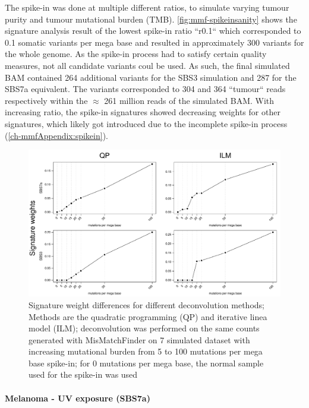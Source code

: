 The spike-in was done at multiple different ratios, to simulate varying tumour purity and tumour mutational burden (TMB). \autoref{fig:mmf-spikeinsanity} shows the signature analysis result of the lowest spike-in ratio ``r0.1`` which corresponded to 0.1 somatic variants per mega base and resulted in approximately 300 variants for the whole genome. As the spike-in process had to satisfy certain quality measures, not all candidate variants coul be used. As such, the final simulated BAM contained 264 additional variants for the SBS3 simulation and 287 for the SBS7a equivalent. The variants corresponded to 304 and 364 ``tumour`` reads respectively within the $\approx$ 261 million reads of the simulated BAM. With increasing ratio, the spike-in signatures showed decreasing weights for other signatures, which likely got introduced due to the incomplete spike-in process (\autoref{ch-mmfAppendix:spikein}).


\begin{figure}[ht]
\centering
\includegraphics[width=.99\linewidth]{Figures/MisMatchFinder/deconstructionMethodsDifferences.pdf}
\caption[Signature weight differences for different deconvolution methods]{Signature weight differences for different deconvolution methods; Methods are the quadratic programming (QP) and iterative linea model (ILM); deconvolution was performed on the same counts generated with MisMatchFinder on 7 simulated dataset with increasing mutational burden from 5 to 100 mutations per mega base spike-in; for 0 mutations per mega base, the normal sample used for the spike-in was used}\label{fig:mmf-methodDifferences}
\end{figure}


\paragraph{Melanoma - UV exposure (SBS7a)}
\label{mmf-sec:melaSim}

